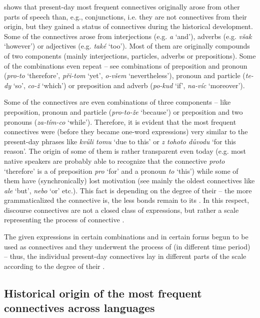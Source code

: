 \documentclass[output=paper]{langsci/langscibook.cls}
\begin{document}
 shows that  present-day most frequent connectives originally arose from other parts of speech than, e.g., conjunctions, i.e. they are not connectives from their origin, but they gained a status of connectives during the historical development. Some of the  connectives arose from interjections (e.g. \textit{a} `and'), adverbs (e.g. \textit{však} `however') or adjectives (e.g. \textit{také} `too'). Most of them are originally compounds of two components (mainly interjections, particles, adverbs or prepositions). Some of the combinations even repeat – see combinations of preposition and pronoun (\textit{pro-to} `therefore', \textit{při-tom} `yet', \textit{o-všem} `nevertheless'), pronoun and particle (\textit{te-dy} `so', \textit{co-ž} `which') or preposition and adverb (\textit{po-kud} `if', \textit{na-víc} `moreover'). 

Some of the connectives are even combinations of three components – like preposition, pronoun and particle (\textit{pro-to-že} `because') or preposition and two pronouns (\textit{za-tím-co} `while'). Therefore, it is evident that the most frequent  connectives were (before they became one-word expressions) very similar to the present-day  phrases like \textit{kvůli tomu} `due to this' or \textit{z tohoto důvodu} `for this reason'. The origin of some of them is rather transparent even today (e.g. most native speakers are probably able to recognize that the connective \textit{proto} `therefore' is a  of preposition \textit{pro} `for' and a pronoun \textit{to} `this') while some of them have (synchronically) lost motivation (see mainly the oldest connectives like \textit{ale} `but', \textit{nebo} `or' etc.). This fact is depending on the degree of their  – the more grammaticalized the connective is, the less bonds remain to its . In this respect, discourse connectives are not a closed class of expressions, but rather a scale representing the process of connective . 

The given expressions in certain combinations and in certain forms begun to be used as connectives and they underwent the process of  (in different time period) – thus, the individual present-day connectives lay in different parts of the scale according to the degree of their .

\subsection{Historical origin of the most frequent connectives across languages}
\end{document}

